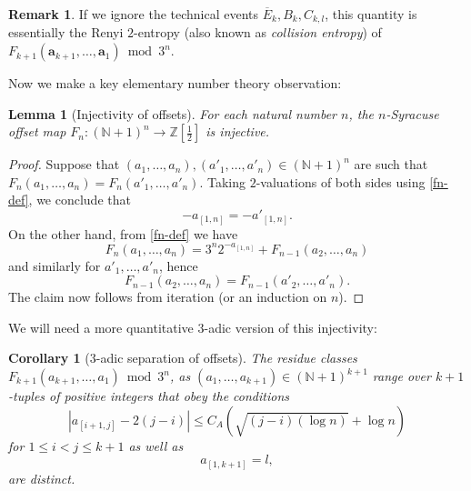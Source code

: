 \documentclass[12pt,a4paper,reqno]{amsart}
\numberwithin{equation}{section}
\theoremstyle{plain}
\newtheorem{lemma}[theorem]{Lemma}
\newtheorem{corollary}[theorem]{Corollary}
\theoremstyle{definition}
\newtheorem{remark}[theorem]{Remark}
\newcommand\Z{\mathbb{Z}}
\newcommand\N{\mathbb{N}}
\renewcommand\a{\mathbf{a}}
\renewcommand{\mod}{\bmod}
\begin{document}
\begin{remark} If we ignore the technical events $\overline{E}_k, B_k, C_{k,l}$, this quantity is essentially the Renyi $2$-entropy (also known as \emph{collision entropy}) of $F_{k+1}(\a_{k+1},\dots,\a_1) \mod 3^n$.
\end{remark}

Now we make a key elementary number theory observation:

\begin{lemma}[Injectivity of offsets]\label{inj}  For each natural number $n$, the $n$-Syracuse offset map $F_n\colon (\N+1)^n \to \Z[\frac{1}{2}]$ is injective.
\end{lemma}

\begin{proof}  Suppose that $(a_1,\dots,a_n), (a'_1,\dots,a'_n) \in (\N+1)^n$ are such that $F_n(a_1,\dots,a_n) = F_n(a'_1,\dots,a'_n)$.  Taking $2$-valuations of both sides using \eqref{fn-def}, we conclude that
$$ - a_{[1,n]} = - a'_{[1,n]}.$$
On the other hand, from \eqref{fn-def} we have
$$ F_n(a_1,\dots,a_n) = 3^n 2^{-a_{[1,n]}} + F_{n-1}(a_2,\dots,a_n)$$
and similarly for $a'_1,\dots,a'_n$, hence
$$ F_{n-1}(a_2,\dots,a_n) = F_{n-1}(a'_2,\dots,a'_n).$$
The claim now follows from iteration (or an induction on $n$).
\end{proof}

We will need a more quantitative $3$-adic version of this injectivity:

\begin{corollary}[$3$-adic separation of offsets]  The residue classes $F_{k+1}(a_{k+1},\dots,a_1) \mod 3^n$, as $(a_1,\dots,a_{k+1}) \in (\N+1)^{k+1}$ range over ${k+1}$-tuples of positive integers that obey the conditions
\begin{equation}\label{amb-x}
 |a_{[i+1,j]} - 2(j-i)| \leq C_A \left( \sqrt{(j-i)(\log n)} + \log n \right)
\end{equation}
for $1 \leq i < j \leq k+1$ as well as
\begin{equation}\label{amb-2x}
a_{[1,k+1]} = l,
\end{equation}
are distinct.
\end{corollary}
\end{document}
